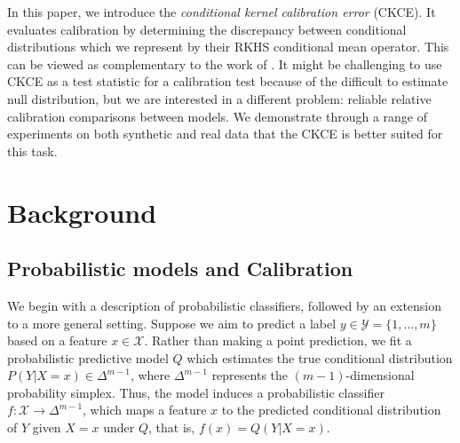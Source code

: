 \documentclass[twocolumn]{article}
\theoremstyle{definition}
\begin{document}
In this paper, we introduce the \emph{conditional kernel calibration error} (CKCE). It evaluates calibration by determining the discrepancy between conditional distributions which we represent by their RKHS conditional mean operator. This can be viewed as complementary to the work of \citet{Widmann_2021}. It might be challenging to use CKCE as a test statistic for a calibration test because of the difficult to estimate null distribution, but we are interested in a different problem: reliable relative calibration comparisons between models. We demonstrate through a range of experiments on both synthetic and real data that the CKCE is better suited for this task. 



\section{Background} \label{sec:background}

\subsection{Probabilistic models and Calibration}

We begin with a description of probabilistic classifiers, followed by an extension to a more general setting. Suppose we aim to predict a label $y \in \mathcal{Y} = \{1, \dots, m\}$ based on a feature $x \in \mathcal{X}$. Rather than making a point prediction, we fit a probabilistic predictive model $Q$ which estimates the true conditional distribution $P(Y|X=x) \in \Delta^{m-1}$, where $\Delta^{m-1}$ represents the $(m-1)$-dimensional probability simplex. Thus, the model induces a probabilistic classifier $f: \mathcal{X} \to \Delta^{m-1}$, which maps a feature $x$ to the predicted conditional distribution of $Y$ given $X=x$ under $Q$, that is, $f(x) = Q(Y | X=x)$.
\end{document}
